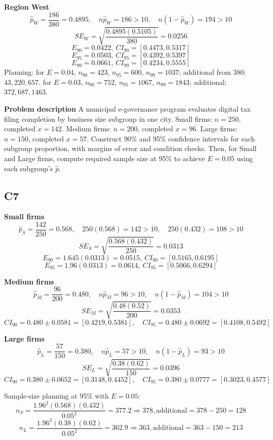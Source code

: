 \begin{ExamProblems}
		\textbf{Region West}
		\[
		\hat{p}_W=\frac{186}{380}=0.4895,
		\quad n\hat{p}_W=186>10,
		\quad n(1-\hat{p}_W)=194>10
		\]
		\[
		SE_W=\sqrt{\frac{0.4895(0.5105)}{380}}=0.0256
		\]
		\[
		E_{90}=0.0422,\ CI_{90}=[0.4473,0.5317]
		\]
		\[
		E_{95}=0.0503,\ CI_{95}=[0.4392,0.5397]
		\]
		\[
		E_{99}=0.0661,\ CI_{99}=[0.4234,0.5555]
		\]
		Planning:
		for $E=0.04$, $n_{90}=423$, $n_{95}=600$, $n_{99}=1037$;
		additional from 380: $43,220,657$.
		for $E=0.03$, $n_{90}=752$, $n_{95}=1067$, $n_{99}=1843$;
		additional: $372,687,1463$.

		\newpage
		\item
		\textbf{Problem description}
		A municipal e-governance program evaluates digital tax filing completion by business size subgroup in one city.
		Small firms: $n=250$, completed $x=142$.
		Medium firms: $n=200$, completed $x=96$.
		Large firms: $n=150$, completed $x=57$.
		Construct 90\% and 95\% confidence intervals for each subgroup proportion, with margins of error and condition checks.
		Then, for Small and Large firms, compute required sample size at 95\% to achieve $E=0.05$ using each subgroup's $\hat{p}$.
		
		\subsection*{C7}
		\textbf{Small firms}
		\[
		\hat{p}_S=\frac{142}{250}=0.568,
		\quad 250(0.568)=142>10,
		\quad 250(0.432)=108>10
		\]
		\[
		SE_S=\sqrt{\frac{0.568(0.432)}{250}}=0.0313
		\]
		\[
		E_{90}=1.645(0.0313)=0.0515,\ CI_{90}=[0.5165,0.6195]
		\]
		\[
		E_{95}=1.96(0.0313)=0.0614,\ CI_{95}=[0.5066,0.6294]
		\]
		
		\textbf{Medium firms}
		\[
		\hat{p}_M=\frac{96}{200}=0.480,
		\quad n\hat{p}_M=96>10,
		\quad n(1-\hat{p}_M)=104>10
		\]
		\[
		SE_M=\sqrt{\frac{0.48(0.52)}{200}}=0.0353
		\]
		\[
		CI_{90}=0.480\pm0.0581=[0.4219,0.5381],
		\quad CI_{95}=0.480\pm0.0692=[0.4108,0.5492]
		\]
		
		\textbf{Large firms}
		\[
		\hat{p}_L=\frac{57}{150}=0.380,
		\quad n\hat{p}_L=57>10,
		\quad n(1-\hat{p}_L)=93>10
		\]
		\[
		SE_L=\sqrt{\frac{0.38(0.62)}{150}}=0.0396
		\]
		\[
		CI_{90}=0.380\pm0.0652=[0.3148,0.4452],
		\quad CI_{95}=0.380\pm0.0777=[0.3023,0.4577]
		\]
		
		Sample-size planning at 95\% with $E=0.05$:
		\[
		n_S=\frac{1.96^2(0.568)(0.432)}{0.05^2}=377.2\Rightarrow378,
		\text{additional}=378-250=128
		\]
		\[
		n_L=\frac{1.96^2(0.38)(0.62)}{0.05^2}=362.9\Rightarrow363,
		\text{additional}=363-150=213
		\]


\end{ExamProblems}
